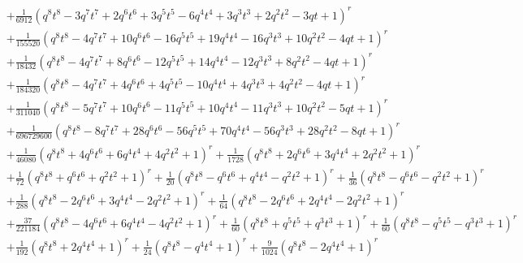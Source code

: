 \documentclass[11pt,english]{amsart}
\numberwithin{equation}{section}
\numberwithin{figure}{section}
\theoremstyle{plain}
\theoremstyle{plain}
\theoremstyle{definition}
\theoremstyle{remark}
\begin{document}
{\begin{align*}
& + \frac{1}{6912}  {\left(q^{8} t^{8} - 3  q^{7} t^{7} + 2  q^{6} t^{6} + 3  q^{5} t^{5} - 6  q^{4} t^{4} + 3  q^{3} t^{3} + 2  q^{2} t^{2} - 3  q t + 1\right)}^{r} \\
& + \frac{1}{155520}  {\left(q^{8} t^{8} - 4  q^{7} t^{7} + 10  q^{6} t^{6} - 16  q^{5} t^{5} + 19  q^{4} t^{4} - 16  q^{3} t^{3} + 10  q^{2} t^{2} - 4  q t + 1\right)}^{r} \\
& + \frac{1}{18432}  {\left(q^{8} t^{8} - 4  q^{7} t^{7} + 8  q^{6} t^{6} - 12  q^{5} t^{5} + 14  q^{4} t^{4} - 12  q^{3} t^{3} + 8  q^{2} t^{2} - 4  q t + 1\right)}^{r} \\
& + \frac{1}{184320}  {\left(q^{8} t^{8} - 4  q^{7} t^{7} + 4  q^{6} t^{6} + 4  q^{5} t^{5} - 10  q^{4} t^{4} + 4  q^{3} t^{3} + 4  q^{2} t^{2} - 4  q t + 1\right)}^{r} \\
& + \frac{1}{311040}  {\left(q^{8} t^{8} - 5  q^{7} t^{7} + 10  q^{6} t^{6} - 11  q^{5} t^{5} + 10  q^{4} t^{4} - 11  q^{3} t^{3} + 10  q^{2} t^{2} - 5  q t + 1\right)}^{r} \\
& + \frac{1}{696729600}  {\left(q^{8} t^{8} - 8  q^{7} t^{7} + 28  q^{6} t^{6} - 56  q^{5} t^{5} + 70  q^{4} t^{4} - 56  q^{3} t^{3} + 28  q^{2} t^{2} - 8  q t + 1\right)}^{r} \\
& + \frac{1}{46080}  {\left(q^{8} t^{8} + 4  q^{6} t^{6} + 6  q^{4} t^{4} + 4  q^{2} t^{2} + 1\right)}^{r} + \frac{1}{1728}  {\left(q^{8} t^{8} + 2  q^{6} t^{6} + 3  q^{4} t^{4} + 2  q^{2} t^{2} + 1\right)}^{r} \\
& + \frac{1}{72}  {\left(q^{8} t^{8} + q^{6} t^{6} + q^{2} t^{2} + 1\right)}^{r} + \frac{1}{20}  {\left(q^{8} t^{8} - q^{6} t^{6} + q^{4} t^{4} - q^{2} t^{2} + 1\right)}^{r} + \frac{1}{36}  {\left(q^{8} t^{8} - q^{6} t^{6} - q^{2} t^{2} + 1\right)}^{r} \\
& + \frac{1}{288}  {\left(q^{8} t^{8} - 2  q^{6} t^{6} + 3  q^{4} t^{4} - 2  q^{2} t^{2} + 1\right)}^{r} + \frac{1}{64}  {\left(q^{8} t^{8} - 2  q^{6} t^{6} + 2  q^{4} t^{4} - 2  q^{2} t^{2} + 1\right)}^{r} \\
& + \frac{37}{221184}  {\left(q^{8} t^{8} - 4  q^{6} t^{6} + 6  q^{4} t^{4} - 4  q^{2} t^{2} + 1\right)}^{r} + \frac{1}{60}  {\left(q^{8} t^{8} + q^{5} t^{5} + q^{3} t^{3} + 1\right)}^{r} + \frac{1}{60}  {\left(q^{8} t^{8} - q^{5} t^{5} - q^{3} t^{3} + 1\right)}^{r} \\
& + \frac{1}{192}  {\left(q^{8} t^{8} + 2  q^{4} t^{4} + 1\right)}^{r} + \frac{1}{24}  {\left(q^{8} t^{8} - q^{4} t^{4} + 1\right)}^{r} + \frac{9}{1024}  {\left(q^{8} t^{8} - 2  q^{4} t^{4} + 1\right)}^{r} \\

\end{align*}}
\end{document}
